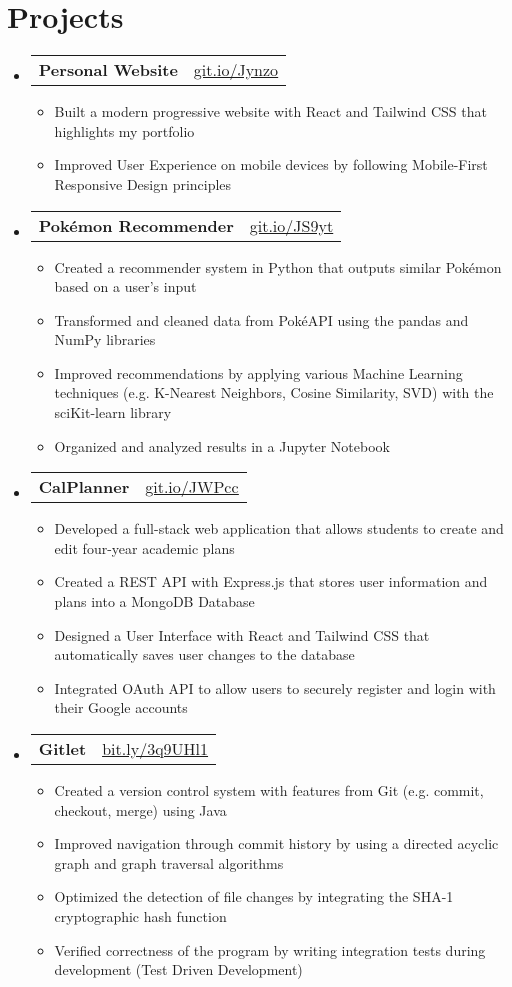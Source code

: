 \documentclass[letterpaper,11pt]{article}
\makeatletter
\newcommand{\resumeItem}[1]{
  \item\small{
    {#1 \vspace{-2pt}}
  }
}
\newcommand{\resumeProjectHeading}[2]{
    \item
    \begin{tabular*}{0.97\textwidth}{l@{\extracolsep{\fill}}r}
      \small#1 & #2 \\
    \end{tabular*}\vspace{-7pt}
}
\newcommand{\resumeSubHeadingListStart}{\begin{itemize}[leftmargin=0.15in, label={}]}
\newcommand{\resumeSubHeadingListEnd}{\end{itemize}}
\newcommand{\resumeItemListStart}{\begin{itemize}}
\newcommand{\resumeItemListEnd}{\end{itemize}\vspace{-5pt}}
\makeatother
\begin{document}
\section{Projects}
    \resumeSubHeadingListStart
      \resumeProjectHeading
          {\textbf{Personal Website}}{\href{https://github.com/huytt621/personal-website}{\underline{git.io/Jynzo}}}
          \resumeItemListStart
                \resumeItem{Built a modern progressive website with React and Tailwind CSS that highlights my portfolio}
                \resumeItem{Improved User Experience on mobile devices by following Mobile-First Responsive Design principles}
          \resumeItemListEnd
      \resumeProjectHeading
          {\textbf{Pok\'emon Recommender}}{\href{https://github.com/huytt621/pokemon-recommender}{\underline{git.io/JS9yt}}}
          \resumeItemListStart
            \resumeItem{Created a recommender system in Python that outputs similar Pok\'emon based on a user's input}
            \resumeItem{Transformed and cleaned data from Pok\'eAPI using the pandas and NumPy libraries}
            \resumeItem{Improved recommendations by applying various Machine Learning techniques (e.g. K-Nearest Neighbors, Cosine Similarity, SVD) with the sciKit-learn library}
            \resumeItem{Organized and analyzed results in a Jupyter Notebook}
          \resumeItemListEnd
      \resumeProjectHeading
          {\textbf{CalPlanner}}{\href{https://github.com/huytt621/calplanner}{\underline{git.io/JWPcc}}}
          \resumeItemListStart
            \resumeItem{Developed a full-stack web application that allows students to create and edit four-year academic plans}
            \resumeItem{Created a REST API with Express.js that stores user information and plans into a MongoDB Database}
            \resumeItem{Designed a User Interface with React and Tailwind CSS that automatically saves user changes to the database}
            \resumeItem{Integrated OAuth API to allow users to securely register and login with their Google accounts}
          \resumeItemListEnd
      \resumeProjectHeading
          {\textbf{Gitlet}}{\href{https://gitfront.io/r/huytt621/6546c41e067e9f94621b90d764d7d16da3abb527/gitlet/}{\underline{bit.ly/3q9UHl1}}}
          \resumeItemListStart
            \resumeItem{Created a version control system with features from Git (e.g. commit, checkout, merge) using Java}
            \resumeItem{Improved navigation through commit history by using a directed acyclic graph and graph traversal algorithms}
            \resumeItem{Optimized the detection of file changes by integrating the SHA-1 cryptographic hash function}
            \resumeItem{Verified correctness of the program by writing integration tests during development (Test Driven Development)}
          \resumeItemListEnd
    \resumeSubHeadingListEnd


\end{document}
